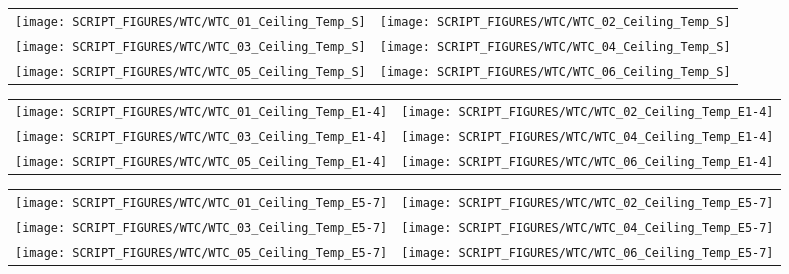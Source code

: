 \begin{figure}[p]
\begin{tabular*}{\textwidth}{l@{\extracolsep{\fill}}r}
\texttt{[image: SCRIPT\_FIGURES/WTC/WTC\_01\_Ceiling\_Temp\_S]} &
\texttt{[image: SCRIPT\_FIGURES/WTC/WTC\_02\_Ceiling\_Temp\_S]} \\
\texttt{[image: SCRIPT\_FIGURES/WTC/WTC\_03\_Ceiling\_Temp\_S]} &
\texttt{[image: SCRIPT\_FIGURES/WTC/WTC\_04\_Ceiling\_Temp\_S]} \\
\texttt{[image: SCRIPT\_FIGURES/WTC/WTC\_05\_Ceiling\_Temp\_S]} &
\texttt{[image: SCRIPT\_FIGURES/WTC/WTC\_06\_Ceiling\_Temp\_S]}
\end{tabular*}
\label{NIST_WTC_Ceiling_S}
\end{figure}

\begin{figure}[p]
\begin{tabular*}{\textwidth}{l@{\extracolsep{\fill}}r}
\texttt{[image: SCRIPT\_FIGURES/WTC/WTC\_01\_Ceiling\_Temp\_E1-4]} &
\texttt{[image: SCRIPT\_FIGURES/WTC/WTC\_02\_Ceiling\_Temp\_E1-4]} \\
\texttt{[image: SCRIPT\_FIGURES/WTC/WTC\_03\_Ceiling\_Temp\_E1-4]} &
\texttt{[image: SCRIPT\_FIGURES/WTC/WTC\_04\_Ceiling\_Temp\_E1-4]} \\
\texttt{[image: SCRIPT\_FIGURES/WTC/WTC\_05\_Ceiling\_Temp\_E1-4]} &
\texttt{[image: SCRIPT\_FIGURES/WTC/WTC\_06\_Ceiling\_Temp\_E1-4]}
\end{tabular*}
\label{NIST_WTC_Ceiling_E1-4}
\end{figure}

\begin{figure}[p]
\begin{tabular*}{\textwidth}{l@{\extracolsep{\fill}}r}
\texttt{[image: SCRIPT\_FIGURES/WTC/WTC\_01\_Ceiling\_Temp\_E5-7]} &
\texttt{[image: SCRIPT\_FIGURES/WTC/WTC\_02\_Ceiling\_Temp\_E5-7]} \\
\texttt{[image: SCRIPT\_FIGURES/WTC/WTC\_03\_Ceiling\_Temp\_E5-7]} &
\texttt{[image: SCRIPT\_FIGURES/WTC/WTC\_04\_Ceiling\_Temp\_E5-7]} \\
\texttt{[image: SCRIPT\_FIGURES/WTC/WTC\_05\_Ceiling\_Temp\_E5-7]} &
\texttt{[image: SCRIPT\_FIGURES/WTC/WTC\_06\_Ceiling\_Temp\_E5-7]}
\end{tabular*}
\label{NIST_WTC_Ceiling_E5-7}
\end{figure}

